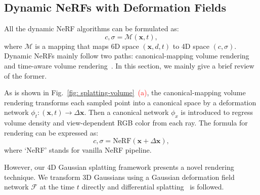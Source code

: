 \subsection{Dynamic NeRFs with Deformation Fields}
\label{subsec:Dynamic NeRFs with deformation Fields.}
All the dynamic NeRF algorithms can be formulated as:
\begin{equation}
    c,\sigma = \mathcal{M}(\mathbf{x},t),
\end{equation}
where $\mathcal{M}$ is a mapping that maps 6D space $(\mathbf{x},d,t)$ to 4D space $(c,\sigma)$. Dynamic NeRFs mainly follow two paths: canonical-mapping volume rendering~\cite{pumarola2021dnerf,park2021nerfies,park2021hypernerf,tineuvox,robustdynamicradiancefields} and time-aware volume rendering~\cite{Dynamicviewsynthesisfromdynamicmonocularvideo,li2022neural,hexplane,kplanes,tensor4d}. In this section, we mainly give a brief review of the former.

 As is shown in Fig.~\ref{fig: splatting-volume}~\textcolor{red}{(a)}, the canonical-mapping volume rendering transforms each sampled point into a canonical space by a deformation network $\phi_t:(\mathbf{x},t)\rightarrow \Delta \mathbf{x}$. Then a canonical network $\phi_x$ is introduced to regress volume density and view-dependent RGB color from each ray. The formula for rendering can be expressed as:
\begin{equation}
    c, \sigma = \text{NeRF}(\mathbf{x}+\Delta \mathbf{x}),
\end{equation}
where `NeRF' stands for vanilla NeRF pipeline.

However, our 4D Gaussian splatting framework presents a novel rendering technique. We transform 3D Gaussians using a Gaussian deformation field network $\mathcal{F}$ at the time $t$ directly and differential splatting~\cite{3dgs} is followed. 


